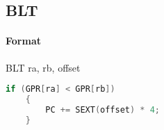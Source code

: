 \subsection{BLT}


\paragraph{Format} BLT ra, rb, offset

\begin{lstlisting}[language=c]
    if (GPR[ra] < GPR[rb])
    {
        PC += SEXT(offset) * 4;
    }
\end{lstlisting}
